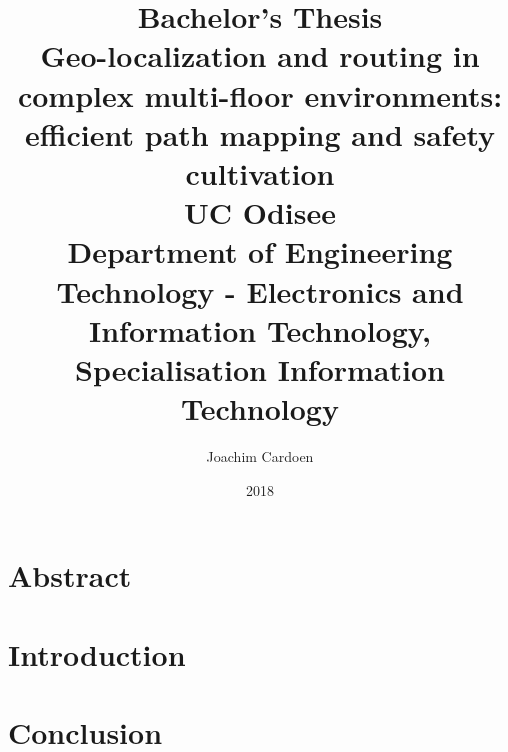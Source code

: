 \documentclass[twoside,12pt]{report}
\title{
    {\large Bachelor's Thesis}\\
    {Geo-localization and routing in complex multi-floor environments: efficient path mapping and safety cultivation}\\
    {\large UC Odisee}\\
    {\large Department of Engineering Technology - Electronics and Information Technology, Specialisation Information Technology}
}
\author{Joachim Cardoen}
\date{2018}
\begin{document}
\maketitle

\chapter*{Abstract}


\tableofcontents

\chapter{Introduction}


\chapter{Conclusion}


\appendix
\chapter{}


\newpage
{}
\end{document}
